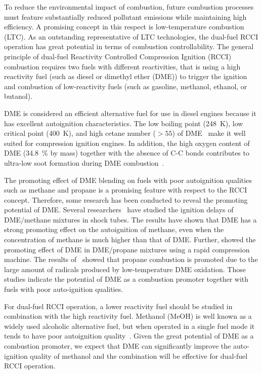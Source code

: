 \documentclass[12pt]{../ussci}
\begin{document}
To reduce the environmental impact of combustion, future combustion processes
must feature substantially reduced pollutant emissions while maintaining high
efficiency. A promising concept in this respect is low-temperature combustion
(LTC). As an outstanding representative of LTC technologies, the dual-fuel RCCI
operation has great potential in terms of combustion controllability. The
general principle of dual-fuel Reactivity Controlled Compression Ignition (RCCI)
combustion requires two fuels with different reactivities, that is using a high
reactivity fuel (such as diesel or dimethyl ether (DME)) to trigger the ignition
and combustion of low-reactivity fuels (such as gasoline, methanol, ethanol, or
butanol).

DME is considered an efficient alternative fuel for use in diesel engines
because it has excellent autoignition characteristics. The low boiling point
(\SI{248}{\K}), low critical point (\SI{400}{\K}), and high cetane number (\(>
55\)) of DME~\autocite{Arcoumanis2008,Teng2001} make it well suited for
compression ignition engines. In addition, the high oxygen content of DME
(\SI{34.8}{\percent} by mass) together with the absence of C-C bonds
contributes to ultra-low soot formation during DME
combustion~\autocite{Arcoumanis2008}.

The promoting effect of DME blending on fuels with poor autoignition qualities
such as methane and propane is a promising feature with respect to the RCCI
concept. Therefore, some research has been conducted to reveal the promoting
potential of DME. Several researchers~\autocite{Burke2015a,Tang2012a,Chen2007a}
have studied the ignition delays of DME/methane mixtures in shock tubes. The
results have shown that DME has a strong promoting effect on the autoignition of
methane, even when the concentration of methane is much higher than that of DME.
Further, \textcite{Dames2016} showed the promoting effect of DME in DME/propane
mixtures using a rapid compression machine. The results of~\autocite{Dames2016}
showed that propane combustion is promoted due to the large amount of radicals
produced by low-temperature DME oxidation. Those studies indicate the potential
of DME as a combustion promoter together with fuels with poor auto-ignition
qualities.

For dual-fuel RCCI operation, a lower reactivity fuel should be studied in
combination with the high reactivity fuel. Methanol (MeOH) is well known as a
widely used alcoholic alternative fuel, but when operated in a single fuel mode
it tends to have poor autoignition quality~\autocite{Siebers1987}. Given the
great potential of DME as a combustion promoter, we expect that DME can
significantly improve the auto-ignition quality of methanol and the combination
will be effective for dual-fuel RCCI operation.
\end{document}
